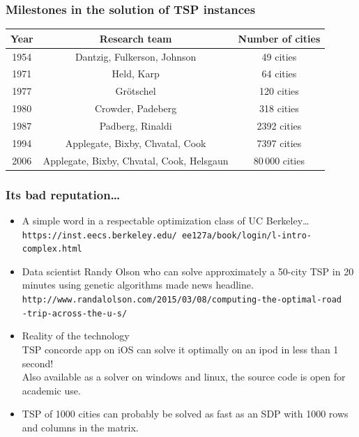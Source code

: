 \documentclass[9pt,handout]{beamer}
\begin{document}
\begin{frame}
\frametitle{Milestones in the solution of TSP instances}
\begin{center}
\begin{tabular}{ccc}
Year & Research team & Number of cities\\
\hline
1954 & Dantzig, Fulkerson, Johnson & 49 cities\\
1971 & Held, Karp & 64 cities\\
1977 & Gr\"otschel & 120 cities\\
1980 & Crowder, Padeberg & 318 cities\\
1987 & Padberg, Rinaldi & 2392 cities\\
1994 & Applegate, Bixby, Chvatal, Cook & 7397 cities\\
2006 & Applegate, Bixby, Chvatal, Cook, Helsgaun & $80\,000$ cities
\end{tabular}
\end{center}

\end{frame}
\begin{frame}
\frametitle{Its bad reputation\ldots}
\begin{itemize}
\item A simple word in a respectable optimization class of UC Berkeley\ldots\\
\texttt{https://inst.eecs.berkeley.edu/~ee127a/book/login/l-intro-complex.html}\medskip
\item Data scientist Randy Olson who can solve \alert{approximately}
a 50-city TSP in 20 minutes using genetic algorithms \alert{made news headline}.\\
\texttt{http://www.randalolson.com/2015/03/08/computing-the-optimal-road}\\
\texttt{-trip-across-the-u-s/}\medskip
\item Reality of the technology \\
TSP concorde app on iOS can solve it optimally on an ipod in less than 1 second!\\
Also available as a solver on windows and linux, the source code is open for academic use.\medskip
\item TSP of 1000 cities can probably be solved as fast as an SDP with 1000 rows and columns in the matrix.
\end{itemize}
\end{frame}
\end{document}
